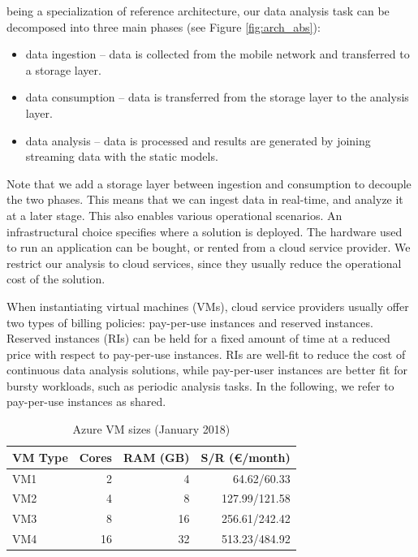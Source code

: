 {being a specialization of \river{} reference architecture, our data analysis task can be decomposed into three main phases (see Figure \ref{fig:arch_abs}):
\begin{itemize}
\item data ingestion -- data is collected from the mobile network and transferred to a storage layer.
\item data consumption -- data is transferred from the storage layer to the analysis layer.
\item data analysis -- data is processed and results are generated by joining streaming data with the static models.
\end{itemize}

Note that we add a storage layer between ingestion and consumption to decouple the two phases. This means that we can ingest data in real-time, and analyze it at a later stage. This also enables various operational scenarios.
An infrastructural choice specifies where a solution is deployed. The hardware used to run an application can be bought, or rented from a cloud service provider. We restrict our analysis to cloud services, since they usually reduce the operational cost of the solution.

When instantiating virtual machines (VMs), cloud service providers usually offer two types of billing policies: pay-per-use instances and reserved instances. Reserved instances (RIs) can be held for a fixed amount of time at a reduced price with respect to pay-per-use instances. RIs are well-fit to reduce the cost of continuous data analysis solutions, while pay-per-user instances are better fit for bursty workloads, such as periodic analysis tasks. In the following, we refer to pay-per-use instances as shared.

\begin{table}[ht]
  \centering
    \caption{Azure VM sizes (January 2018)}
  \begin{tabular}{@{}lrrr@{}} \toprule
  VM Type & Cores & RAM (GB) & S/R (\euro/month)\\
    \midrule
  VM1 & 2 & 4 & 64.62/60.33\\
  VM2 & 4 & 8 & 127.99/121.58\\
  VM3 & 8 & 16 & 256.61/242.42\\
  VM4 & 16 & 32 & 513.23/484.92\\
    \bottomrule
  \end{tabular}
    \label{tab:sizes}
\end{table}

}
